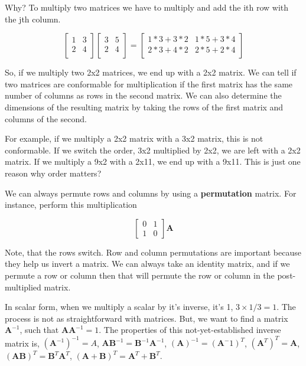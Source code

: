 \documentclass[
]{book}
\begin{document}
Why? To multiply two matrices we have to multiply and add the ith row
with the jth column.

\[
\begin{bmatrix}
1&3 \\
2&4\\
\end{bmatrix}
\begin{bmatrix}
3&5 \\
2&4\\
\end{bmatrix}=
\begin{bmatrix}
1*3+3*2&1*5+3*4 \\
2*3+4*2&2*5+2*4\\
\end{bmatrix}
\]

So, if we multiply two 2x2 matrices, we end up with a 2x2 matrix. We can
tell if two matrices are conformable for multiplication if the first
matrix has the same number of columns as rows in the second matrix. We
can also determine the dimensions of the resulting matrix by taking the
rows of the first matrix and columns of the second.

For example, if we multiply a 2x2 matrix with a 3x2 matrix, this is not
conformable. If we switch the order, 3x2 multiplied by 2x2, we are left
with a 2x2 matrix. If we multiply a 9x2 with a 2x11, we end up with a
9x11. This is just one reason why order matters?

We can always permute rows and columns by using a
\textbf{permutation} matrix. For instance, perform this
multiplication

\[
\begin{bmatrix}
0&1\\
1&0
\end{bmatrix} \textbf{A}
\]

Note, that the rows switch. Row and column permutations are important
because they help us invert a matrix. We can always take an identity
matrix, and if we permute a row or column then that will permute the row
or column in the post-multiplied matrix.

In scalar form, when we multiply a scalar by it's inverse, it's 1,
\(3 \times 1/3=1\). The process is not as straightforward with matrices.
But, we want to find a matrix \(\textbf{A}^{-1}\), such that
\(\textbf{A}\textbf{A}^{-1}=1\). The properties of this
not-yet-established inverse matrix is, \((\textbf{A}^{-1})^{-1}=A\),
\(\textbf{AB}^{-1}=\textbf{B}^{-1}\textbf{A}^{-1}\),
\((\textbf{A})^{-1}=(\textbf{A}^-1)^{T}\),
\((\textbf{A}^{T})^{T}=\textbf{A}\),
\((\textbf{AB})^T=\textbf{B}^T\textbf{A}^T\),
\((\textbf{A}+\textbf{B})^{T}=\textbf{A}^T+\textbf{B}^T\).
\end{document}
